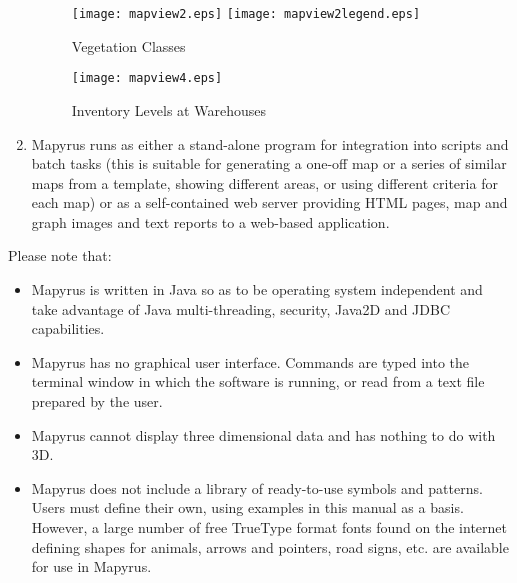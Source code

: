 \begin{enumerate}
\begin{figure}
\texttt{[image: mapview2.eps]}
\texttt{[image: mapview2legend.eps]}
\caption{Vegetation Classes}
\label{mapview2}
\end{figure}

\begin{figure}
\texttt{[image: mapview4.eps]}
\caption{Inventory Levels at Warehouses}
\label{mapview4}
\end{figure}

\item
Mapyrus runs as either
a stand-alone program for integration into
scripts and batch tasks  (this is suitable for generating a one-off
map or a series of similar maps from a template,
showing different areas, or using different criteria for each map)
or as a self-contained web server providing HTML pages, map and
graph images and text reports to a web-based application.

\end{enumerate}

Please note that:

\begin{itemize}
\item
Mapyrus is written in Java so as to be operating system independent
and take advantage of Java multi-threading, security,
Java2D and JDBC capabilities.

\item
Mapyrus has no graphical user interface.
Commands are typed into the terminal window in which the software is running,
or read from a text file prepared by the user.

\item
Mapyrus cannot display three dimensional data and has nothing to do
with 3D.

\item
Mapyrus does not include a library of ready-to-use symbols and patterns.
Users must define their own, using examples in this manual as a basis.
However, a large number of free TrueType format fonts found on the internet
defining shapes for animals, arrows and pointers, road signs, etc. are
available for use in Mapyrus.

\end{itemize}

